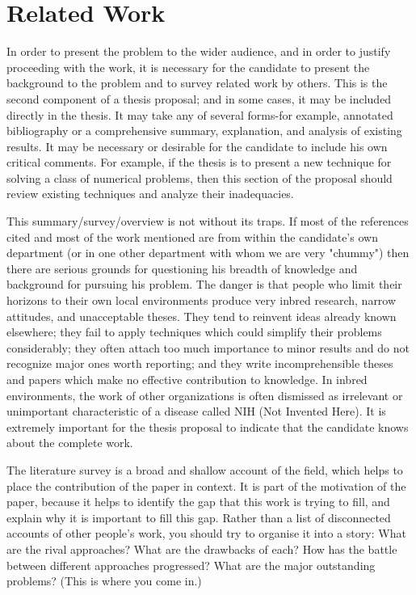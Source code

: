 \section{Related Work}\label{sec:relatedwork}


In order to present the problem to the wider audience, and in order to justify proceeding with the work, it is necessary for the candidate to present the background to the problem and to survey related work by others. This is the second component of a thesis proposal; and in some cases, it may be included directly in the thesis. It may take any of several forms-for example, annotated bibliography or a comprehensive summary, explanation, and analysis of existing results. It may be necessary or desirable for the candidate to include his own critical comments. For example, if the thesis is to present a new technique for solving a class of numerical problems, then this section of the proposal should review existing techniques and analyze their inadequacies.

This summary/survey/overview is not without its traps. If most of the references cited and most of the work mentioned are from within the candidate's own department (or in one other department with whom we are very "chummy") then there are serious grounds for questioning his breadth of knowledge and background for pursuing his problem. The danger is that people who limit their horizons to their own local environments produce very inbred research, narrow attitudes, and unacceptable theses. They tend to reinvent ideas already known elsewhere; they fail to apply techniques which could simplify their problems considerably; they often attach too much importance to minor results and do not recognize major ones worth reporting; and they write incomprehensible theses and papers which make no effective contribution to knowledge. In inbred environments, the work of other organizations is often dismissed as irrelevant or unimportant characteristic of a disease called NIH (Not Invented Here). It is extremely important for the thesis proposal to indicate that the candidate knows about the complete work.

The literature survey is a broad and shallow account of the field, which helps
to place the contribution of the paper in context. It is part of the
motivation of the paper, because it helps to identify the gap that this work
is trying to fill, and explain why it is important to fill this gap. Rather 
than a list of disconnected accounts of other people's work, you should try to 
organise it into a story: What are the rival approaches? What are the 
drawbacks of each?
How has the battle between different approaches progressed? What are the 
major outstanding problems? (This is where you come in.)

